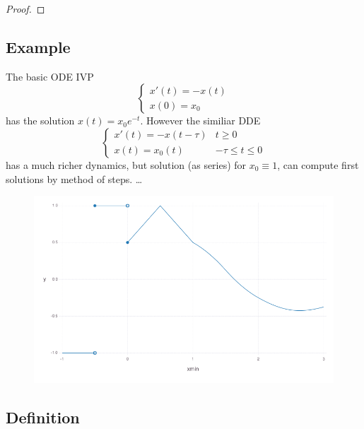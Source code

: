 \documentclass[10pt]{article}
\begin{document}
\begin{proof}

\end{proof}


\subsection{Example}\label{example}
The basic ODE IVP
\begin{equation}
    \begin{cases}
        x'(t) = -x(t)\\
        x(0) = x_0
    \end{cases}
\end{equation}
has the solution $x(t)=x_0 e^{-t}$. However the similiar DDE
\begin{equation}
    \begin{cases}
        x'(t) = -x(t-\tau) & t\geq 0\\
        x(t) = x_0(t) & -\tau\leq t\leq 0
    \end{cases}
\end{equation}
has a much richer dynamics, but solution (as series) for $x_0\equiv 1$, can compute first solutions by method of steps. \ldots{}

\begin{figure}[h]\centering
    \includegraphics[width=\textwidth]{figures/piecewise-initial-function.png}
	\label{fig:not-allowed}
\end{figure}

\subsection{Definition}\label{definition}
\end{document}
